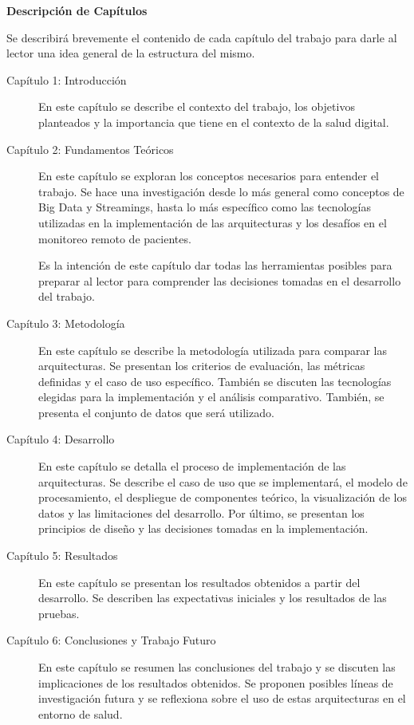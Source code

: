 \thispagestyle{empty}

\begin{center}
    \Large\bfseries Descripción de Capítulos
\end{center}
\vspace{1cm}

Se describirá brevemente el contenido de cada capítulo del trabajo para darle al lector una idea general de la estructura del mismo.

\begin{description}
    \item[Capítulo 1: Introducción]
    En este capítulo se describe el contexto del trabajo, los objetivos planteados y la importancia que tiene en el contexto de la salud digital. 
    \item[Capítulo 2: Fundamentos Teóricos]
    En este capítulo se exploran los conceptos necesarios para entender el trabajo.
    Se hace una investigación desde lo más general como conceptos de Big Data y Streamings, 
    hasta lo más específico como las tecnologías utilizadas en la implementación de las arquitecturas 
    y los desafíos en el monitoreo remoto de pacientes.  

    Es la intención de este capítulo dar todas las herramientas posibles para preparar al lector para comprender las decisiones tomadas en el desarrollo del trabajo.
    \item[Capítulo 3: Metodología]
    En este capítulo se describe la metodología utilizada para comparar las arquitecturas.
    Se presentan los criterios de evaluación, las métricas definidas y el caso de uso específico.
    También se discuten las tecnologías elegidas para la implementación y el análisis comparativo.
    También, se presenta el conjunto de datos que será utilizado.
    \item[Capítulo 4: Desarrollo]
    En este capítulo se detalla el proceso de implementación de las arquitecturas.
    Se describe el caso de uso que se implementará, 
    el modelo de procesamiento, el despliegue de componentes teórico, la visualización de los datos y las limitaciones del desarrollo.
    Por último, se presentan los principios de diseño y las decisiones tomadas en la implementación.
    \item[Capítulo 5: Resultados]
    En este capítulo se presentan los resultados obtenidos a partir del desarrollo.
    Se describen las expectativas iniciales y los resultados de las pruebas.
    \item[Capítulo 6: Conclusiones y Trabajo Futuro]
    En este capítulo se resumen las conclusiones del trabajo y se discuten las implicaciones de los resultados obtenidos. 
    Se proponen posibles líneas de investigación futura y se reflexiona sobre el uso de estas arquitecturas en el entorno de salud.
\end{description}